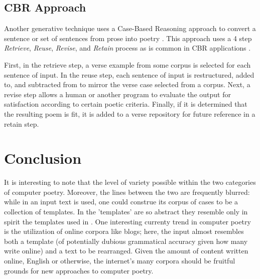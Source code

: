 \documentclass[10pt]{article}
\begin{document}
\subsection{CBR Approach}
Another generative technique uses a Case-Based Reasoning approach to convert a
sentence or set of sentences from prose into poetry \cite{Gervas01}. This
approach uses a 4 step \emph{Retrieve}, \emph{Reuse}, \emph{Revise}, and
\emph{Retain} process as is common in CBR applications \cite{Wong08}. 

First, in the retrieve step, a verse example from some corpus is selected for
each sentence of input. In the reuse step, each sentence of input is
restructured, added to, and subtracted from to mirror the verse case selected
from a corpus.  Next, a revise step allows a human or another program to
evaluate the output for satisfaction according to certain poetic criteria.
Finally, if it is determined that the resulting poem is fit, it is added to a
verse repository for future reference in a retain step.


\section{Conclusion}
It is interesting to note that the level of variety possible within the two
categories of computer poetry. Moreover, the lines between the two are
frequently blurred: while in \cite{Gervas01} an input text is used, one could
construe its corpus of cases to be a collection of templates. In
\cite{Manurung03} the 'templates' are so abstract they resemble only in spirit
the templates used in \cite{Chamb84}. One interesting currenty trend in
computer poetry is the utilization of online corpora like blogs; here, the
input almost resembles both a template (of potentially dubious grammatical
accuracy given how many write online) and a text to be rearranged. Given the
amount of content written online, English or otherwise, the internet's many
corpora should be fruitful grounds for new approaches to computer poetry.



\end{document}
